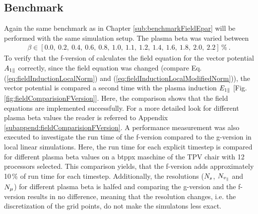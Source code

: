 \subsection{Benchmark}
\label{sub:benchmarkLinearFVersion}


Again the same benchmark as in Chapter \ref{sub:benchmarkFieldEpar} will be performed with the same simulation setup. The plasma beta was varied between
\begin{gather}
    \beta \in [0.0,~0.2,~0.4,~0.6,~0.8,~1.0,~1.1,~1.2,~1.4,~1.6,~1.8,~2.0,~2.2]\,\%~.
\end{gather}
To verify that the f-version of {\gkw} calculates the field equation for the vector potential $A_{1\parallel}$ correctly, since the field equation was changed (compare Eq. (\ref{eq:fieldInductionLocalNorm}) and (\ref{eq:fieldInductionLocalModifiedNorm})), the vector potential is compared a second time with the plasma induction $E_{1\parallel}$ [Fig. \ref{fig:fieldComparisionFVersion}]. Here, the comparison shows that the field equations are implemented successfully. For a more detailed look for different plasma beta values the reader is referred to Appendix \ref{subappend:fieldComparisionFVersion}. A performance measurement was also executed to investigate the run time of the f-version compared to the g-version in local linear simulations. Here, the run time for each explicit timestep is compared for different plasma beta values on a btppx maschine of the TPV chair with 12 processors selected. This comparison yields, that the f-version adds approximately 10\,\% of run time for each timestep. Additionally, the resolutions ($N_s$, $N_{v_\parallel}$ and $N_\mu$) for different plasma beta is halfed and comparing the g-version and the f-version results in no difference, meaning that the resolution changes, i.e. the discretization of the grid points, do not make the simulatons less exact.


